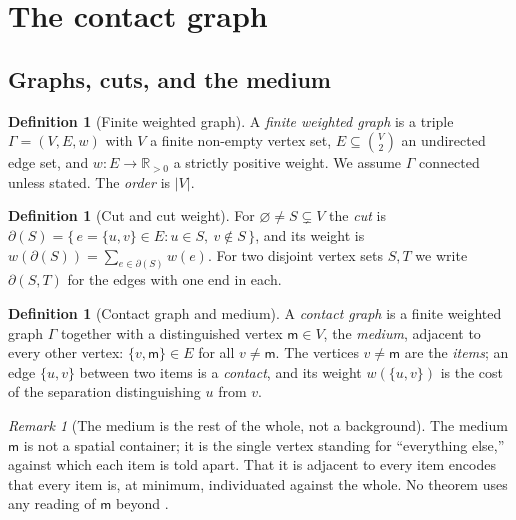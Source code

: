 \documentclass[11pt,twocolumn,a4paper]{article}
\theoremstyle{thmstyle}
\theoremstyle{definition}
\newtheorem{definition}[theorem]{Definition}
\theoremstyle{remark}
\newtheorem{remark}[theorem]{Remark}
\newcommand{\R}{\mathbb{R}}
\newcommand{\Gph}{\Gamma}
\newcommand{\V}{V}
\newcommand{\E}{E}
\newcommand{\wt}{w}
\newcommand{\med}{\mathsf{m}}            %
\newcommand{\cut}{\partial}              %
\newcommand{\abs}[1]{\lvert#1\rvert}
\begin{document}
\section{The contact graph}
\label{sec:graph}

\subsection{Graphs, cuts, and the medium}

\begin{definition}[Finite weighted graph]
\label{def:graph}
A \emph{finite weighted graph} is a triple $\Gph=(\V,\E,\wt)$ with $\V$ a
finite non-empty vertex set, $\E\subseteq\binom{\V}{2}$ an undirected edge
set, and $\wt\colon\E\to\R_{>0}$ a strictly positive weight. We assume
$\Gph$ connected unless stated. The \emph{order} is $\abs{\V}$.
\end{definition}

\begin{definition}[Cut and cut weight]
\label{def:cut}
For $\varnothing\neq S\subsetneq\V$ the \emph{cut} is
$\cut(S)=\{\,e=\{u,v\}\in\E:u\in S,\ v\notin S\,\}$, and its weight is
$\wt(\cut(S))=\sum_{e\in\cut(S)}\wt(e)$. For two disjoint vertex sets
$S,T$ we write $\cut(S,T)$ for the edges with one end in each.
\end{definition}

\begin{definition}[Contact graph and medium]
\label{def:contact-graph}
A \emph{contact graph} is a finite weighted graph $\Gph$ together with a
distinguished vertex $\med\in\V$, the \emph{medium}, adjacent to every
other vertex: $\{v,\med\}\in\E$ for all $v\neq\med$. The vertices
$v\neq\med$ are the \emph{items}; an edge $\{u,v\}$ between two items is a
\emph{contact}, and its weight $\wt(\{u,v\})$ is the cost of the
separation distinguishing $u$ from $v$.
\end{definition}

\begin{remark}[The medium is the rest of the whole, not a background]
\label{rem:medium}
The medium $\med$ is not a spatial container; it is the single vertex
standing for ``everything else,'' against which each item is told apart.
That it is adjacent to every item encodes that every item is, at minimum,
individuated against the whole. No theorem uses any reading of $\med$
beyond .
\end{remark}
\end{document}
